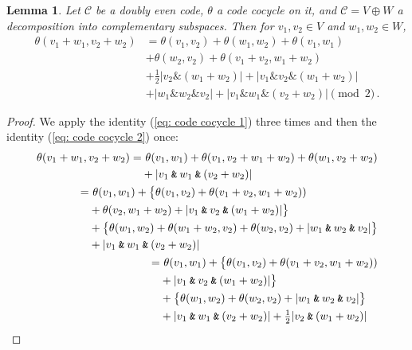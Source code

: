 \documentclass{article}
\theoremstyle{plain}
\newtheorem{lemma}{Lemma}
\theoremstyle{definition}
\def \cC {\mathcal{C}}
\newcommand{\AND}{\mathbin{\texttt{\&}}}
\def\And{\mathbin{\&}}
\def\Plus{+}
\begin{document}
\begin{lemma}\label{lemma:formula lemma}
Let $\cC$ be a doubly even code, $\theta$ a code cocycle on it, and $\cC = V\oplus W$ a decomposition into complementary subspaces.
Then for $v_1,v_2\in V$ and $w_1,w_2\in W$,
\begin{align}\label{eq:theformula}
	\theta(v_1\Plus w_1,v_2\Plus w_2)	
		& = \theta(v_1,v_2)  + \theta(w_1,w_2) + \theta(v_1,w_1) \\
		&+ \theta(w_2,v_2) + \theta(v_1\Plus v_2,w_1\Plus w_2) \nonumber \\
							& + \tfrac12|v_2\And(w_1\Plus w_2)| + |v_1\And v_2 \And (w_1\Plus w_2)| \nonumber \\
							&+|w_1\And w_2 \And v_2| + \left|v_1\And w_1 \And (v_2 \Plus  w_2)\right| \pmod 2\,. \nonumber
\end{align}
\end{lemma}

\begin{proof}
We apply the identity (\ref{eq: code cocycle 1}) three times and then the identity (\ref{eq: code cocycle 2}) once:
\begin{align*}
\begin{split}
	\theta(v_1+w_1,v_2+w_2) =&\ \theta(v_1,w_1) + \theta(v_1,v_2+w_1+w_2) + \theta(w_1,v_2+w_2) \\
	&+ |v_1\AND w_1\AND(v_2+w_2)| 
\end{split}\\
\begin{split}
	 =&\ \theta(v_1,w_1) + \big\{ \theta(v_1,v_2) + \theta(v_1+v_2,w_1+w_2)) \\ 
	 & + \theta(v_2,w_1+w_2) + |v_1\AND v_2 \AND (w_1+w_2)| \big\} \\
	 & + \big\{\theta(w_1,w_2) + \theta(w_1+w_2,v_2) + \theta(w_2,v_2) + |w_1\AND w_2\AND v_2| \big\} \\
	 & + |v_1\AND w_1\AND(v_2+w_2)| 
\end{split}\\
\begin{split}
	 =&\ \theta(v_1,w_1) + \big\{ \theta(v_1,v_2) + \theta(v_1+v_2,w_1+w_2)) \\ 
	 & +  |v_1\AND v_2 \AND (w_1+w_2)| \big\} \\
	 & + \big\{\theta(w_1,w_2) + \theta(w_2,v_2) + |w_1\AND w_2\AND v_2| \big\} \\
	 & + |v_1\AND w_1\AND(v_2+w_2)| + \tfrac12|v_2\AND (w_1+w_2)| \qedhere
\end{split}
\end{align*}
\end{proof}
\end{document}
